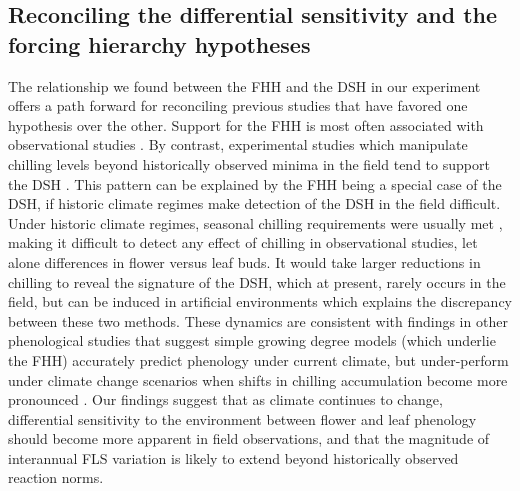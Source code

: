\documentclass[11pt]{article}\usepackage[]{graphicx}\usepackage[]{color}
\begin{document}
\subsection*{Reconciling the differential sensitivity and the forcing hierarchy hypotheses}
\noindent The relationship we found between the FHH and the DSH in our experiment offers a path forward for reconciling previous studies that have favored one hypothesis over the other. Support for the FHH is most often associated with observational studies \citep[e.g.][]{COSMULESCU:2020aa,Guo2014}. By contrast, experimental studies which manipulate chilling levels beyond historically observed minima in the field tend to support the DSH \citep[e.g.][]{Aslani2009,Gariglio2006}. This pattern can be explained by the FHH being a special case of the DSH, if historic climate regimes make detection of the DSH in the field difficult.\\ %

\noindent Under historic climate regimes, seasonal chilling requirements were usually met \citep{Gauzere2019,Chuine:2016aa}, making it difficult to detect any effect of chilling in observational studies, let alone differences in flower versus leaf buds. It would take larger reductions in chilling to reveal the signature of the DSH, which at present, rarely occurs in the field, but can be induced in artificial environments which explains the discrepancy between these two methods. These dynamics are consistent with findings in other phenological studies that suggest simple growing degree models (which underlie the FHH) accurately predict phenology under current climate, but under-perform under climate change scenarios when shifts in chilling accumulation become more pronounced \citep{Linkosalo2008,Chuine:2016aa}. Our findings suggest that as climate continues to change, differential sensitivity to the environment between flower and leaf phenology should become more apparent in field observations, and that the magnitude of interannual FLS variation is likely to extend beyond historically observed reaction norms.\\ 

\end{document}

